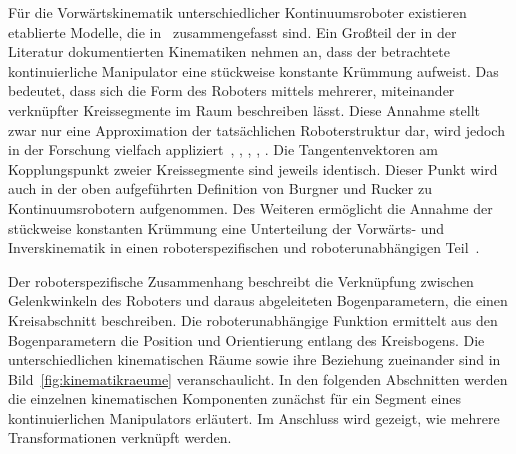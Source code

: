 Für die Vorwärtskinematik unterschiedlicher Kontinuumsroboter existieren etablierte Modelle, die in~\cite{WIJ10} zusammengefasst sind.
Ein Großteil der in der Literatur dokumentierten Kinematiken nehmen an, dass der betrachtete kontinuierliche Manipulator eine stückweise konstante Krümmung aufweist. 
Das bedeutet, dass sich die Form des Roboters mittels mehrerer, miteinander verknüpfter Kreissegmente im Raum beschreiben lässt. Diese Annahme stellt zwar nur eine Approximation der tatsächlichen Roboterstruktur dar, wird jedoch in der Forschung vielfach appliziert~\cite{HW03}, \cite{STF04}, \cite{JW06a}, \cite{RJWRC09}, \cite{DLIB10}. 
Die Tangentenvektoren am Kopplungspunkt zweier Kreissegmente sind jeweils identisch. Dieser Punkt wird auch in der oben aufgeführten Definition von Burgner und Rucker zu Kontinuumsrobotern aufgenommen.
Des Weiteren ermöglicht die Annahme der stückweise konstanten Krümmung eine Unterteilung der Vorwärts- und Inverskinematik in einen roboterspezifischen und roboterunabhängigen Teil~\cite{WIJ10}. 

Der roboterspezifische Zusammenhang beschreibt die Verknüpfung zwischen Gelenkwinkeln des Roboters und daraus abgeleiteten Bogenparametern, die einen Kreisabschnitt beschreiben. Die roboterunabhängige Funktion ermittelt aus den Bogenparametern die Position und Orientierung entlang des Kreisbogens.
Die unterschiedlichen kinematischen Räume sowie ihre Beziehung zueinander sind in Bild~\ref{fig:kinematikraeume} veranschaulicht. In den folgenden Abschnitten werden die einzelnen kinematischen Komponenten zunächst für ein Segment eines kontinuierlichen Manipulators erläutert. Im Anschluss wird gezeigt, wie mehrere Transformationen verknüpft werden.  

